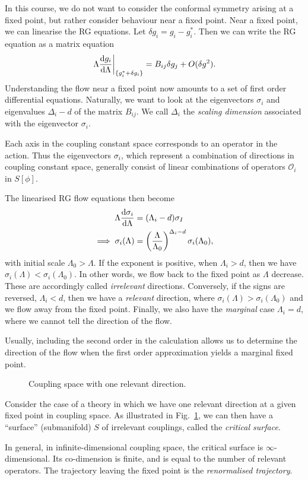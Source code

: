 In this course, we do not want to consider the conformal symmetry arising at a fixed point, but rather consider behaviour near a fixed point.
Near a fixed point, we can linearise the RG equations. Let $\delta g_i = g_i - g_i^*$. Then we can write the RG equation as a matrix equation
\begin{equation}
  \left.\Lambda \dv{g_i}{\Lambda} \right\rvert_{\{g_i^* + \delta g_i\}} = B_{ij} \delta g_j + O(\delta g^2).
\end{equation}
Understanding the flow near a fixed point now amounts to a set of first order differential equations.
Naturally, we want to look at the eigenvectors $\sigma_i$ and eigenvalues $\Delta_i - d$ of the matrix $B_{ij}$.
We call $\Delta_i$ the \emph{scaling dimension} associated with the eigenvector $\sigma_i$.
\begin{remark}
  Each axis in the coupling constant space corresponds to an operator in the action. 
  Thus the eigenvectors $\sigma_i$, which represent a combination of directions in coupling constant space, generally consist of linear combinations of operators $\mathcal{O}_i$ in $S[\phi]$.
\end{remark}

The linearised RG flow equations then become
\begin{align}
  \Lambda \dv{\sigma_i}{\Lambda} &= (\Lambda_i - d) \sigma_I \\
  \implies \sigma_i (\Lambda) &= \left( \frac{\Lambda}{\Lambda_0} \right)^{\Delta_i - d} \sigma_i(\Lambda_0),
\end{align}
with initial scale $\Lambda_0 > \Lambda$.
If the exponent is positive, when $\Lambda_i > d$, then we have $\sigma_i (\Lambda) < \sigma_i(\Lambda_0)$. In other words, we flow back to the fixed point as $\Lambda$ decrease.
These are accordingly called \emph{irrelevant} directions.
Conversely, if the signs are reversed, $\Lambda_i < d$, then we have a \emph{relevant} direction, where $\sigma_i (\Lambda) > \sigma_i(\Lambda_0)$ and we flow away from the fixed point.
Finally, we also have the \emph{marginal} case $\Lambda_i = d$, where we cannot tell the direction of the flow.
\begin{remark}
  Usually, including the second order in the calculation allows us to determine the direction of the flow when the first order approximation yields a marginal fixed point.
\end{remark}

\begin{figure}[tbhp]
  \centering
  \def\svgwidth{0.4\columnwidth}
  
  \caption{Coupling space with one relevant direction.}
  \label{fig:l14f2}
\end{figure}

Consider the case of a theory in which we have one relevant direction at a given fixed point in coupling space.
As illustrated in Fig.~\ref{fig:l14f2}, we can then have a ``surface'' (submanifold) $S$ of irrelevant couplings, called the \emph{critical surface}.

In general, in infinite-dimensional coupling space, the critical surface is $\infty$-dimensional.
Its co-dimension is finite, and is equal to the number of relevant operators.
The trajectory leaving the fixed point is the \emph{renormalised trajectory}.

